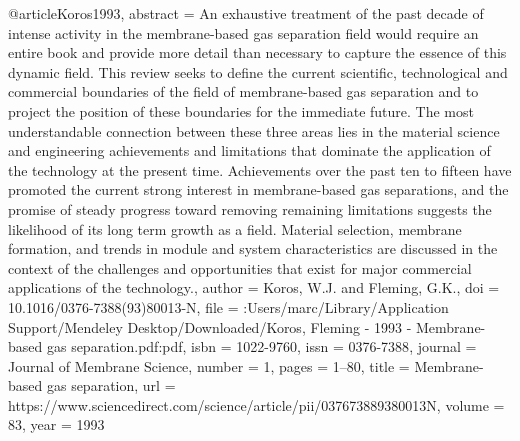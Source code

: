 @article{Koros1993,
abstract = {An exhaustive treatment of the past decade of intense activity in the membrane-based gas separation field would require an entire book and provide more detail than necessary to capture the essence of this dynamic field. This review seeks to define the current scientific, technological and commercial boundaries of the field of membrane-based gas separation and to project the position of these boundaries for the immediate future. The most understandable connection between these three areas lies in the material science and engineering achievements and limitations that dominate the application of the technology at the present time. Achievements over the past ten to fifteen have promoted the current strong interest in membrane-based gas separations, and the promise of steady progress toward removing remaining limitations suggests the likelihood of its long term growth as a field. Material selection, membrane formation, and trends in module and system characteristics are discussed in the context of the challenges and opportunities that exist for major commercial applications of the technology.},
author = {Koros, W.J. and Fleming, G.K.},
doi = {10.1016/0376-7388(93)80013-N},
file = {:Users/marc/Library/Application Support/Mendeley Desktop/Downloaded/Koros, Fleming - 1993 - Membrane-based gas separation.pdf:pdf},
isbn = {1022-9760},
issn = {0376-7388},
journal = {Journal of Membrane Science},
number = {1},
pages = {1--80},
title = {{Membrane-based gas separation}},
url = {https://www.sciencedirect.com/science/article/pii/037673889380013N},
volume = {83},
year = {1993}
}
